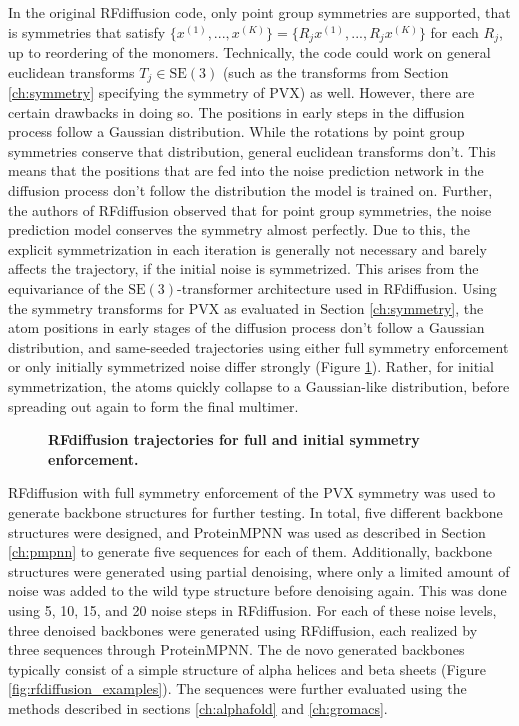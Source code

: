 In the original RFdiffusion code, only point group symmetries are supported, that is symmetries that satisfy $\{x^{(1)}, ..., x^{(K)}\} = \{R_j x^{(1)}, ..., R_j x^{(K)}\}$ for each $R_j$, up to reordering of the monomers. Technically, the code could work on general euclidean transforms $T_j \in \mathrm{SE}(3)$ (such as the transforms from Section \ref{ch:symmetry} specifying the symmetry of PVX) as well. However, there are certain drawbacks in doing so. The positions in early steps in the diffusion process follow a Gaussian distribution. While the rotations by point group symmetries conserve that distribution, general euclidean transforms don't. This means that the positions that are fed into the noise prediction network in the diffusion process don't follow the distribution the model is trained on. Further, the authors of RFdiffusion observed that for point group symmetries, the noise prediction model conserves the symmetry almost perfectly. Due to this, the explicit symmetrization in each iteration is generally not necessary and barely affects the trajectory, if the initial noise is symmetrized. This arises from the equivariance of the $\mathrm{SE}(3)$-transformer architecture used in RFdiffusion. Using the symmetry transforms for PVX as evaluated in Section \ref{ch:symmetry}, the atom positions in early stages of the diffusion process don't follow a Gaussian distribution, and same-seeded trajectories using either full symmetry enforcement or only initially symmetrized noise differ strongly (Figure \ref{fig:rfdiff_sym_trajectories}). Rather, for initial symmetrization, the atoms quickly collapse to a Gaussian-like distribution, before spreading out again to form the final multimer.

\begin{figure}[!hbtp]
    \centering
    
    \caption{\textbf{RFdiffusion trajectories for full and initial symmetry enforcement. }}
    \label{fig:rfdiff_sym_trajectories}
\end{figure}

\FloatBarrier

RFdiffusion with full symmetry enforcement of the PVX symmetry was used to generate backbone structures for further testing. In total, five different backbone structures were designed, and ProteinMPNN was used as described in Section \ref{ch:pmpnn} to generate five sequences for each of them. Additionally, backbone structures were generated using partial denoising, where only a limited amount of noise was added to the wild type structure before denoising again. This was done using 5, 10, 15, and 20 noise steps in RFdiffusion. For each of these noise levels, three denoised backbones were generated using RFdiffusion, each realized by three sequences through ProteinMPNN. The de novo generated backbones typically consist of a simple structure of alpha helices and beta sheets (Figure \ref{fig:rfdiffusion_examples}). The sequences were further evaluated using the methods described in sections \ref{ch:alphafold} and \ref{ch:gromacs}.


